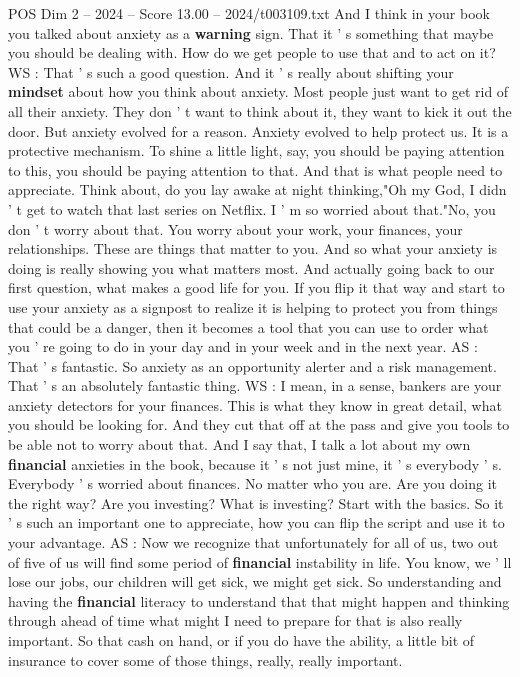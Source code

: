 \begin{textsample}{POS Dim 2 – 2024 – Score 13.00 – 2024/t003109.txt}
And I think in your book you talked about anxiety as a \textbf{warning} sign.
That it ' s something that maybe you should be dealing with.
How do we get people to use that and to act on it?
WS : That ' s such a good question.
And it ' s really about shifting your \textbf{mindset} about how you think about anxiety.
Most people just want to get rid of all their anxiety.
They don ' t want to think about it, they want to kick it out the door.
But anxiety evolved for a reason.
Anxiety evolved to help protect us.
It is a protective mechanism.
To shine a little light, say, you should be paying attention to this, you should be paying attention to that.
And that is what people need to appreciate.
Think about, do you lay awake at night thinking,"Oh my God, I didn ' t get to watch that last series on Netflix.
I ' m so worried about that."No, you don ' t worry about that.
You worry about your work, your finances, your relationships.
These are things that matter to you.
And so what your anxiety is doing is really showing you what matters most.
And actually going back to our first question, what makes a good life for you.
If you flip it that way and start to use your anxiety as a signpost to realize it is helping to protect you from things that could be a danger, then it becomes a tool that you can use to order what you ' re going to do in your day and in your week and in the next year.
AS : That ' s fantastic.
So anxiety as an opportunity alerter and a risk management.
That ' s an absolutely fantastic thing.
WS : I mean, in a sense, bankers are your anxiety detectors for your finances.
This is what they know in great detail, what you should be looking for.
And they cut that off at the pass and give you tools to be able not to worry about that.
And I say that, I talk a lot about my own \textbf{financial} anxieties in the book, because it ' s not just mine, it ' s everybody ' s.
Everybody ' s worried about finances.
No matter who you are.
Are you doing it the right way?
Are you investing?
What is investing?
Start with the basics.
So it ' s such an important one to appreciate, how you can flip the script and use it to your advantage.
AS : Now we recognize that unfortunately for all of us, two out of five of us will find some period of \textbf{financial} instability in life.
You know, we ' ll lose our jobs, our children will get sick, we might get sick.
So understanding and having the \textbf{financial} literacy to understand that that might happen and thinking through ahead of time what might I need to prepare for that is also really important.
So that cash on hand, or if you do have the ability, a little bit of insurance to cover some of those things, really, really important.

\end{textsample}
